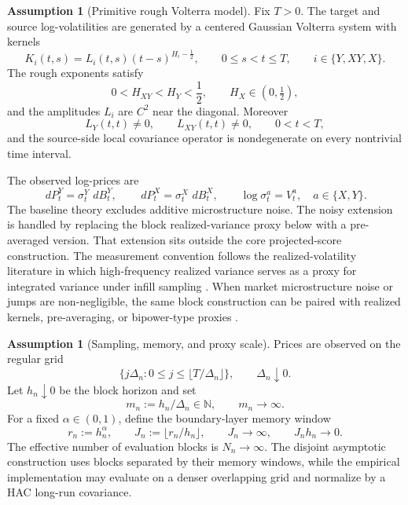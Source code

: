 \documentclass[11pt,a4paper]{amsart}
\theoremstyle{plain}
\theoremstyle{definition}
\newtheorem{assumption}[theorem]{Assumption}
\theoremstyle{remark}
\newcommand{\N}{\mathbb{N}}
\newcommand{\dd}{\,d}
\begin{document}
\begin{assumption}[Primitive rough Volterra model]\label{ass:primitive-volterra}
Fix \(T>0\).  The target and source log-volatilities are generated by a centered Gaussian Volterra
system with kernels
\[
        K_i(t,s)
        =
        L_i(t,s)(t-s)^{H_i-\frac12},
        \qquad
        0\le s<t\le T,
        \qquad
        i\in\{Y,XY,X\}.
\]
The rough exponents satisfy
\[
        0<H_{XY}<H_Y<\frac12,
        \qquad
        H_X\in(0,\tfrac12),
\]
and the amplitudes \(L_i\) are \(C^2\) near the diagonal.  Moreover
\[
        L_Y(t,t)\neq0,
        \qquad
        L_{XY}(t,t)\neq0,
        \qquad
        0<t<T,
\]
and the source-side local covariance operator is nondegenerate on every nontrivial time interval.
\end{assumption}

The observed log-prices are
\[
        \dd P_t^Y=\sigma_t^Y\,\dd B_t^Y,
        \qquad
        \dd P_t^X=\sigma_t^X\,\dd B_t^X,
        \qquad
        \log\sigma_t^a=V_t^a,\quad a\in\{X,Y\}.
\]
The baseline theory excludes additive microstructure noise.  The noisy extension is handled by
replacing the block realized-variance proxy below with a pre-averaged version.  That extension
sits outside the core projected-score construction.  The measurement convention follows the
realized-volatility literature in which high-frequency realized variance serves as a proxy for
integrated variance under infill sampling
\cite{barndorff2002realized,andersen2003realized}.  When market microstructure noise or jumps are
non-negligible, the same block construction can be paired with realized kernels, pre-averaging, or
bipower-type proxies \cite{bnhls2008realizedkernels,jacod2009preaveraging,bns2004bipower}.

\begin{assumption}[Sampling, memory, and proxy scale]\label{ass:primitive-sampling}
Prices are observed on the regular grid
\[
        \{j\Delta_n:0\le j\le \lfloor T/\Delta_n\rfloor\},
        \qquad
        \Delta_n\downarrow0.
\]
Let \(h_n\downarrow0\) be the block horizon and set
\[
        m_n:=h_n/\Delta_n\in\N,
        \qquad
        m_n\to\infty.
\]
For a fixed \(\alpha\in(0,1)\), define the boundary-layer memory window
\[
        r_n:=h_n^\alpha,
        \qquad
        J_n:=\bigl\lfloor r_n/h_n\bigr\rfloor,
        \qquad
        J_n\to\infty,
        \qquad
        J_nh_n\to0.
\]
The effective number of evaluation blocks is \(N_n\to\infty\).  The disjoint asymptotic
construction uses
blocks separated by their memory windows, while the empirical implementation may evaluate on a
denser overlapping grid and normalize by a HAC long-run covariance.
\end{assumption}
\end{document}
